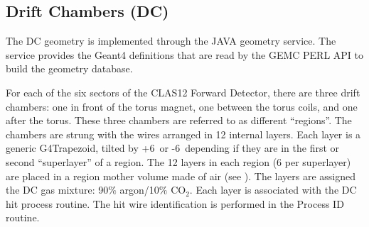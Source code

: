 \subsection{Drift Chambers (DC)}

The DC geometry is implemented through the JAVA geometry service.
The service provides the Geant4 definitions that are read by the GEMC PERL API to build the geometry database.

For each of the six sectors of the CLAS12 Forward Detector, there are three drift chambers: one in front of the torus magnet,
one between the torus coils, and one after the torus.  These three chambers are referred to as different ``regions''.
The chambers are strung with the wires arranged in 12 internal layers.
Each layer is a generic G4Trapezoid, tilted by +6\mdeg \ or -6\mdeg \ depending if they are in the first or second
``superlayer'' of a region.
The 12 layers in each region (6 per superlayer) are placed in a region mother volume made of air (see ).
The layers are assigned the DC gas mixture: 90$\%$ argon/10$\%$ CO$_2$. Each layer is associated with the DC hit process routine.
The hit wire identification is performed in the Process ID routine.

